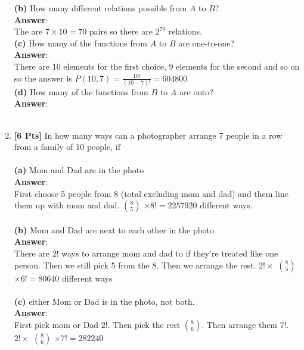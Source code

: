 \documentclass[11pt]{article}
\begin{document}
\begin{enumerate}
        \textbf{(b)} How many different relations possible from $A$ to $B$?\\
\textbf{Answer}:\\
The are $7 \times 10 = 70$ pairs so there are $2^{70}$ relations.\\

        \textbf{(c)} How many of the functions from $A$ to $B$ are one-to-one?\\
\textbf{Answer}:\\
There are 10 elements for the first choice, 9 elements for the second and so on so the answer is $P(10, 7) = \frac{10!}{(10-7)!} = 604800$\\

        \textbf{(d)} How many of the functions from $B$ to $A$ are onto?\\
\textbf{Answer}:\\\\






\item {\bf [6 Pts]} In how many ways can a photographer arrange 7 people in a row from a family of 10 people, if\\\\
\textbf{(a)} Mom and Dad are in the photo\\
\textbf{Answer}:\\ 
First choose 5 people from 8 (total excluding mom and dad) and them line them up with mom and dad. $8 \choose 5$ $\times 8! = 2257920$ different ways.\\\\
\textbf{(b)} Mom and Dad are next to each other in the photo\\
\textbf{Answer}:\\ 
There are $2!$ ways to arrange mom and dad to if they're treated like one person. Then we still pick 5 from the 8. Then we arrange the rest. $2! \times $ $8 \choose 5$ $\times 6! = 80640$ different ways\\\\
\textbf{(c)} either Mom or Dad is in the photo, not both.\\
\textbf{Answer}:\\
First pick mom or Dad $2!$. Then pick the rest $8 \choose 6$. Then arrange them $7!$. $2! \times$ $8 \choose 6$ $\times 7! = 282240$\\\\

\clearpage






\end{enumerate}
\end{document}
